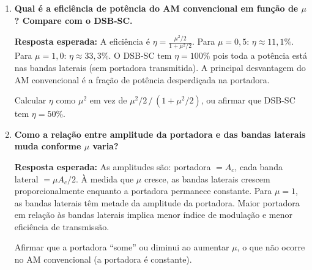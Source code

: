 \documentclass[11pt,a4paper]{article}
\begin{document}
\begin{enumerate}[label=\textbf{Q\arabic*.}, leftmargin=*, itemsep=1em]
    \begin{nota}
      Dizer apenas que ``há distorção'' sem explicar o mecanismo matemático:
      $|x| \neq x$ para $x < 0$, o que dobra a frequência aparente na região negativa.
    \end{nota}

  \item \textbf{Qual é a eficiência de potência do AM convencional em função de $\mu$? Compare com o DSB-SC.}

    \textbf{Resposta esperada:} A eficiência é
    $\eta = \tfrac{\mu^2/2}{1 + \mu^2/2}$. Para $\mu=0{,}5$:
    $\eta \approx 11{,}1\%$. Para $\mu=1{,}0$: $\eta \approx 33{,}3\%$.
    O DSB-SC tem $\eta = 100\%$ pois toda a potência está nas bandas laterais (sem
    portadora transmitida). A principal desvantagem do AM convencional é a fração
    de potência desperdiçada na portadora.

    \begin{nota}
      Calcular $\eta$ como $\mu^2$ em vez de $\mu^2/2\,/\,(1+\mu^2/2)$, ou afirmar
      que DSB-SC tem $\eta = 50\%$.
    \end{nota}

  \item \textbf{Como a relação entre amplitude da portadora e das bandas laterais muda conforme $\mu$ varia?}

    \textbf{Resposta esperada:} As amplitudes são: portadora $= A_c$, cada banda lateral
    $= \mu A_c/2$. À medida que $\mu$ cresce, as bandas laterais crescem
    proporcionalmente enquanto a portadora permanece constante. Para $\mu=1$, as bandas
    laterais têm metade da amplitude da portadora. Maior portadora em relação às bandas
    laterais implica menor índice de modulação e menor eficiência de transmissão.

    \begin{nota}
      Afirmar que a portadora ``some'' ou diminui ao aumentar $\mu$, o que não ocorre
      no AM convencional (a portadora é constante).
    \end{nota}

\end{enumerate}
\end{document}
